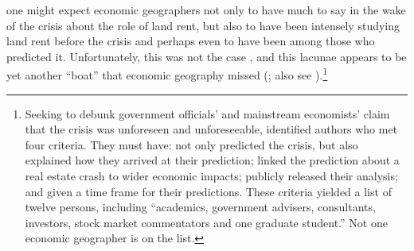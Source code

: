 one might expect economic geographers not only to have much to say
in the wake of the crisis about the role of land rent, but also to
have been intensely studying land rent before the crisis and perhaps
even to have been among those who predicted it. Unfortunately, this
was not the case \citep{ward2016virtual}, and this lacunae appears
to be yet another ``boat'' that economic geography missed (\citealt{dicken2004geographers};
also see \citealt{taylor2012islandlife}).\footnote{Seeking to debunk government officials' and mainstream economists'
claim that the crisis was unforeseen and unforeseeable, \citet[7-9]{bezemer2009noone}identified
authors who met four criteria. They must have: not only predicted
the crisis, but also explained how they arrived at their prediction;
linked the prediction about a real estate crash to wider economic
impacts; publicly released their analysis; and given a time frame
for their predictions. These criteria yielded a list of twelve persons,
including ``academics, government advisers, consultants, investors,
stock market commentators and one graduate student.'' Not one economic
geographer is on the list.}

